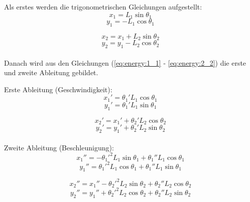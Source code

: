 \documentclass[12pt]{article}
\numberwithin{equation}{subsection}
\begin{document}
Als erstes werden die trigonometrischen Gleichungen aufgestellt:
\begin{equation} \label{eq:energy:1_1}
	x_1 = L_1\sin\theta_1
\end{equation}
\begin{equation} \label{eq:energy:1_2}
	y_1 = -L_1\cos\theta_1
\end{equation}

\begin{equation} \label{eq:energy:2_1}
	x_2 = x_1 + L_2\sin\theta_2
\end{equation}
\begin{equation} \label{eq:energy:2_2}
	y_2 = y_1 - L_2\cos\theta_2
\end{equation}
\
\\
Danach wird aus den Gleichungen (\ref{eq:energy:1_1} - \ref{eq:energy:2_2}) die erste und zweite Ableitung gebildet.

Erste Ableitung (Geschwindigkeit):
\begin{equation} \label{eq:velocity:1_1}
	x_1' = \theta_1' L_1\cos\theta_1
\end{equation}
\begin{equation} \label{eq:velocity:1_2}
	y_1' = \theta_1' L_1\sin\theta_1
\end{equation}

\begin{equation} \label{eq:velocity:2_1}
	x_2' = x_1' + \theta_2' L_2\cos\theta_2
\end{equation}
\begin{equation} \label{eq:velocity:2_2}
	y_2' = y_1' + \theta_2' L_2\sin\theta_2
\end{equation}
\
\\
Zweite Ableitung (Beschleunigung):
\begin{equation} \label{eq:acceleration:1_1}
	x_1'' = -{\theta_1'}^2 L_1 \sin\theta_1 + \theta_1'' L_1 \cos\theta_1
\end{equation}
\begin{equation} \label{eq:acceleration:1_2}
	y_1'' = {\theta_1'}^2 L_1 \cos\theta_1 + \theta_1'' L_1 \sin\theta_1
\end{equation}

\begin{equation} \label{eq:acceleration:2_1}
	x_2'' = x_1'' - {\theta_2'}^2 L_2\sin\theta_2 + \theta_2'' L_2 \cos\theta_2
\end{equation}
\begin{equation} \label{eq:acceleration:2_2}
	y_2'' = y_1'' + {\theta_2'}^2 L_2\cos\theta_2 + \theta_2'' L_2 \sin\theta_2
\end{equation}
\clearpage
\end{document}

